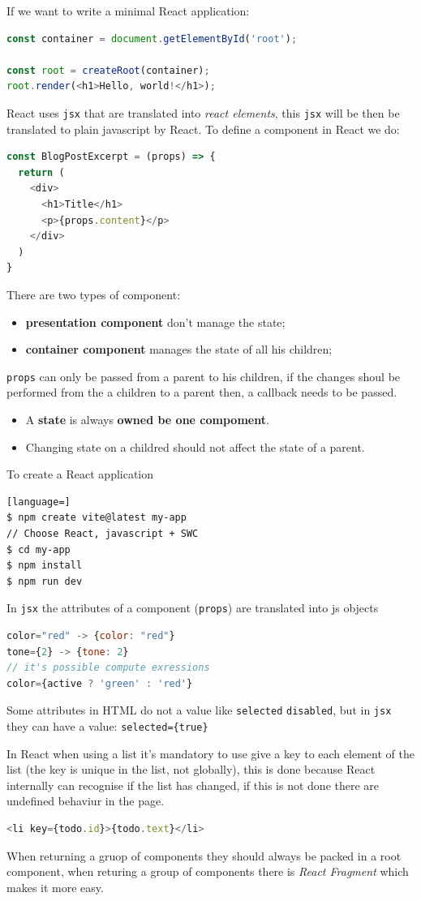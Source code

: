 \documentclass[12pt]{article}
\begin{document}
If we want to write a minimal React application:
\begin{lstlisting}[language=js]
const container = document.getElementById('root');

const root = createRoot(container);
root.render(<h1>Hello, world!</h1>);
\end{lstlisting}
React uses \texttt{jsx} that are translated into \emph{react elements}, this \texttt{jsx} will be then be translated to plain javascript by React. To define a component in React we do:
\begin{lstlisting}[language=js]
const BlogPostExcerpt = (props) => {
  return (
    <div>
      <h1>Title</h1>
      <p>{props.content}</p>
    </div>
  )
}
\end{lstlisting}
There are two types of component: 
\begin{itemize}
  \item \textbf{presentation component} don't manage the state;
  \item \textbf{container component} manages the state of all his children;
\end{itemize}
\texttt{props} can only be passed from a parent to his children, if the changes shoul be performed from the a children to a parent then, a callback needs to be passed.
\begin{center}
\end{center}
\begin{itemize}
  \item A \textbf{state} is always \textbf{owned be one compoment}.
  \item Changing state on a childred should not affect the state of a parent.
\end{itemize}
To create a React application
\begin{lstlisting}[language=]
$ npm create vite@latest my-app
// Choose React, javascript + SWC
$ cd my-app
$ npm install
$ npm run dev
\end{lstlisting}
In \texttt{jsx} the attributes of a component (\texttt{props}) are translated into js objects
\begin{lstlisting}[language=js]
color="red" -> {color: "red"}
tone={2} -> {tone: 2}
// it's possible compute exressions
color={active ? 'green' : 'red'}
\end{lstlisting}
Some attributes in HTML do not a value like \texttt{selected} \texttt{disabled}, but in \texttt{jsx} they can have a value: \verb|selected={true}|

In React when using a list it's mandatory to use give a key to each element of the list (the key is unique in the list, not globally), this is done because React internally can recognise if the list has changed, if this is not done there are undefined behaviur in the page.
\begin{lstlisting}[language=js]
<li key={todo.id}>{todo.text}</li>
\end{lstlisting}
When returning a gruop of components they should always be packed in a root component, when returing a  group of components there is \emph{React Fragment} which makes it more easy.
\end{document}
